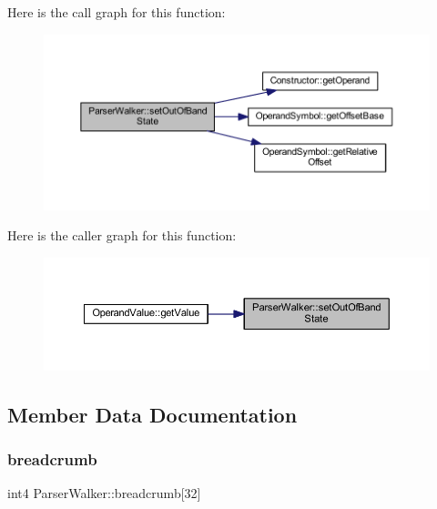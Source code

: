 Here is the call graph for this function\+:
\nopagebreak
\begin{figure}[H]
\begin{center}
\leavevmode
\includegraphics[width=350pt]{class_parser_walker_a917b2a69e5a2d62857666389d95bf757_cgraph}
\end{center}
\end{figure}
Here is the caller graph for this function\+:
\nopagebreak
\begin{figure}[H]
\begin{center}
\leavevmode
\includegraphics[width=350pt]{class_parser_walker_a917b2a69e5a2d62857666389d95bf757_icgraph}
\end{center}
\end{figure}


\subsection{Member Data Documentation}
\mbox{\label{class_parser_walker_acbc73bc7057a259a7e605f2075291fdf}} 
\subsubsection{\texorpdfstring{breadcrumb}{breadcrumb}}
{\footnotesize\ttfamily int4 Parser\+Walker\+::breadcrumb\mbox{[}32\mbox{]}\hspace{0.3cm}{\ttfamily [protected]}}



